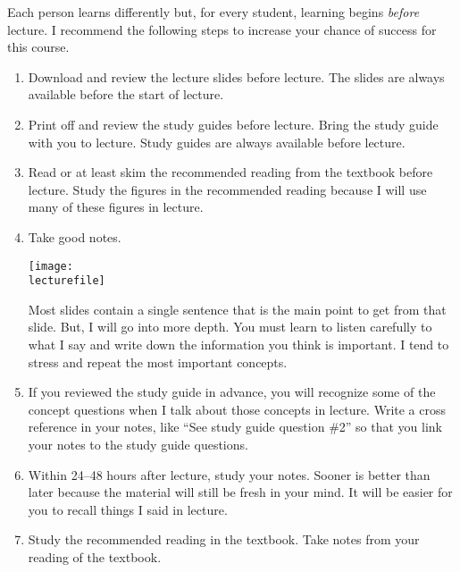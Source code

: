\documentclass[letterpaper]{tufte-handout}
\newcommand\lecturefile{163_lecture00}
\begin{document}
Each person learns differently but, for every student, learning begins \emph{before} lecture.  I recommend the following steps to increase your chance of success for this course. 


\begin{enumerate}
	
	\item Download and review the lecture slides before lecture. The slides are always available before the start of lecture.

	\item Print off and review the study guides before lecture. Bring the study guide with you to lecture. Study guides are always available before lecture.
	
	\item Read or at least skim the recommended reading from the textbook before lecture. Study the figures in the recommended reading because I will use many of these figures in lecture.
	
	\item Take good notes.\begin{marginfigure}\texttt{[image: \\lecturefile]}\end{marginfigure} Most slides contain a single sentence that is the main point to get from that slide. But, I will go into more depth. You must learn to listen carefully to what I say and write down the information you think is important. I tend to stress and repeat the most important concepts. 
	
	\item If you reviewed the study guide in advance, you will recognize some of the concept questions when I talk about those concepts in lecture. Write a cross reference in your notes, like “See study guide question \#2” so that you link your notes to the study guide questions.
	
	\item Within 24–48 hours after lecture, study your notes.  Sooner is better than later because the material will still be fresh in your mind. It will be easier for you to recall things I said in lecture.
	
	\item Study the recommended reading in the textbook. Take notes from your reading of the textbook.
	

\end{enumerate}
\end{document}
